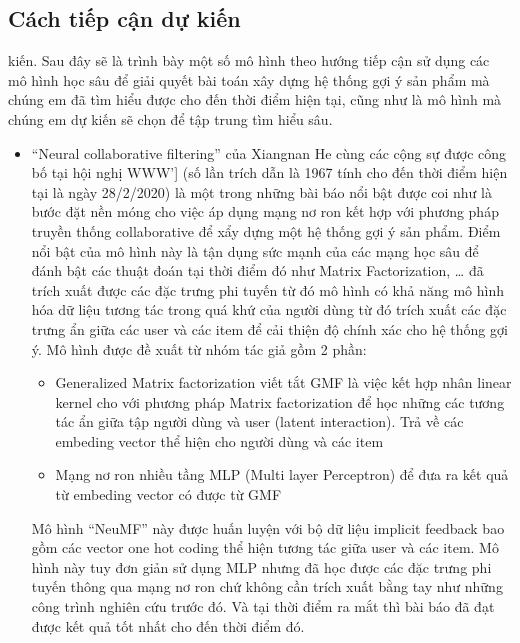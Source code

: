 \documentclass{article}[14pt]
\begin{document}
{    \subsection{Cách tiếp cận dự kiến}
    
kiến.
    Sau đây sẽ là trình bày một số mô hình theo hướng tiếp cận sử dụng các 
mô hình học sâu để giải quyết bài toán xây dựng hệ thống gợi ý sản phẩm 
mà chúng em đã tìm hiểu được cho đến thời điểm hiện tại, cũng như là mô 
hình mà chúng em dự kiến sẽ chọn để tập trung tìm hiểu sâu. 
    
    
\begin{itemize}
\item  	“Neural collaborative filtering” của Xiangnan He cùng các cộng sự 
được công bố tại hội nghị WWW’] \cite{neumf} (số lần trích dẫn là 1967 tính 
cho đến thời điểm hiện tại là ngày 28/2/2020) là một trong những bài báo nổi 
bật được coi như là bước đặt nền móng cho việc áp dụng mạng nơ ron kết hợp 
với phương pháp truyền thống collaborative để xẩy dựng một hệ thống gợi ý 
sản phẩm.
Điểm nổi bật của mô hình này là tận dụng sức mạnh của các mạng học sâu để 
đánh bật các thuật đoán tại thời điểm đó như Matrix Factorization, …  đã 
trích xuất được các đặc trưng phi tuyến từ đó mô hình có khả năng mô hình 
hóa dữ liệu tương tác trong quá khứ của người dùng từ đó trích xuất các đặc 
trưng ẩn giữa các user và các item để cải thiện độ chính xác cho hệ thống 
gợi ý.
Mô hình được đề xuất từ nhóm tác giả gồm 2 phần: 
\begin{itemize}
    \item  Generalized Matrix factorization viết tắt GMF là việc kết hợp 
nhân linear kernel cho với phương pháp Matrix factorization để học những 
các tương tác ẩn giữa tập người dùng và user (latent interaction).
    Trả về các embeding vector thể hiện cho người dùng và các item
    \item 	Mạng nơ ron nhiều tầng MLP (Multi layer Perceptron) để đưa ra 	
kết quả từ embeding vector có được từ GMF
\end{itemize}
Mô hình “NeuMF” này được huấn luyện với bộ dữ liệu implicit feedback bao gồm 
các vector one hot coding thể hiện tương tác giữa user và các item.
Mô hình này tuy đơn giản sử dụng MLP nhưng đã học được các đặc trưng phi 
tuyến thông qua mạng nơ ron chứ không cần trích xuất bằng tay như những công 
trình nghiên cứu trước đó. 
Và tại thời điểm ra mắt thì bài báo đã đạt được kết quả tốt nhất cho đến 
thời điểm đó.


\end{itemize}}
\end{document}
